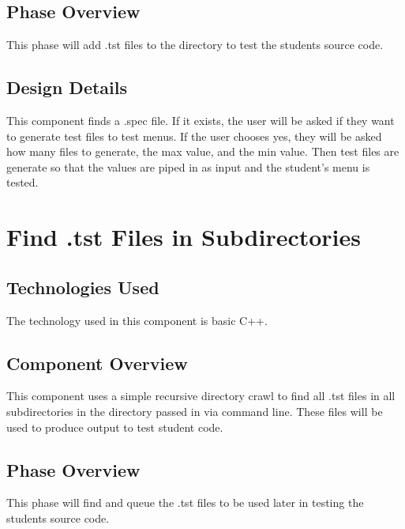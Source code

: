 \subsection {Phase Overview}
This phase will add .tst files to the directory to test the students source code. 

\subsection {Design Details}
This component finds a .spec file. If it exists, the user will be asked if they want to generate test files to test menus. If the user chooses yes, they will be asked how many files to generate, the max value, and the min value. Then test files are generate so that the values are piped in as input and the student's menu is tested.


\section{Find .tst Files in Subdirectories }

\subsection{Technologies  Used}
The technology used in this component is basic C++.

\subsection{Component  Overview}
This component uses a simple recursive directory crawl to find all .tst files in all subdirectories in the directory passed in via command line. These files will be used to produce output to test student code. 

\subsection{Phase Overview}
This phase will find and queue the .tst files to be used later in testing the students source code.  

